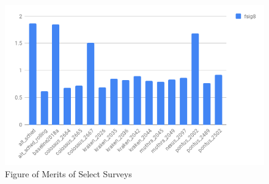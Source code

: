 \documentclass[a4paper,10pt]{article}
\begin{document}

\begin{figure}[htbp]
   \centering
   \includegraphics[scale=0.5]{chart.png} %
   \caption{Figure of Merits of Select Surveys}
   \label{fig:fom}
\end{figure}
\end{document}
